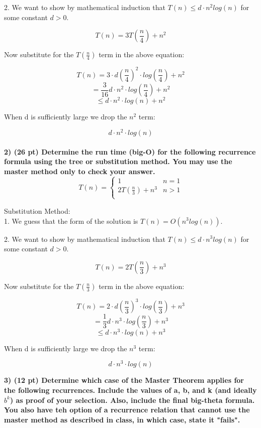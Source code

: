 \documentclass[12pt, a4paper]{article}
\begin{document}
2. We want to show by mathematical induction that $ T(n) \leq d \cdot n^2 log(n) $ for some constant $ d > 0 $. 

\[
  T(n) = 3T \left(\frac{n}{4} \right) + n^2
\]
\begin{center}
  Now substitute for the $T \left(\frac{n}{4} \right)$ term in the above equation:
  \end{center}
\[
  T(n) = 3 \cdot d \left(\frac{n}{4} \right)^2 \cdot log \left(\frac{n}{4} \right) + n^2
\]
\[
  = \frac{3}{16} d \cdot n^2 \cdot log \left(\frac{n}{4} \right) + n^2
\]
\[
  \leq d \cdot n^2 \cdot log(n) + n^2
\]
\begin{center}
  When d is sufficiently large we drop the $ n^2 $ term:
\end{center}
\[
  d \cdot n^2 \cdot log(n)
\]
\\

\textbf{2) (26 pt) Determine the run time (big-O) for the following recurrence formula using the tree or substitution method.
You may use the master method only to check your answer.} \\

\[
  T(n) =  
  \begin{cases}
    1 & n = 1  \\
    2T(\frac{n}{3}) + n^3 & n > 1  \\
  \end{cases}
\]

Substitution Method: \\ 

1. We guess that the form of the solution is $ T(n) = O(n^3 log(n)) $.

2. We want to show by mathematical induction that $ T(n) \leq d \cdot n^3 log(n) $ for some constant $ d > 0 $. 

\[
  T(n) = 2T \left(\frac{n}{3} \right) + n^3
\]
\begin{center}
  Now substitute for the $T \left(\frac{n}{3} \right)$ term in the above equation:
\end{center}
\[
  T(n) = 2 \cdot d \left(\frac{n}{3} \right)^3 \cdot log \left(\frac{n}{3} \right) + n^3
\]
\[
  = \frac{1}{3} d \cdot n^3 \cdot log \left(\frac{n}{3} \right) + n^3
\]
\[
  \leq d \cdot n^3 \cdot log(n) + n^3
\]
\begin{center}
  When d is sufficiently large we drop the $ n^3 $ term:
\end{center}
\[
  d \cdot n^3 \cdot log(n)
\]
\newpage

\textbf{3) (12 pt) Determine which case of the Master Theorem applies for the following recurrences. Include the values of
a, b, and k (and ideally $b^k$) as proof of your selection. Also, include the final big-theta formula. 
You also have teh option of a recurrence relation that cannot use the master method as described in class, 
in which case, state it "fails". }
\end{document}
